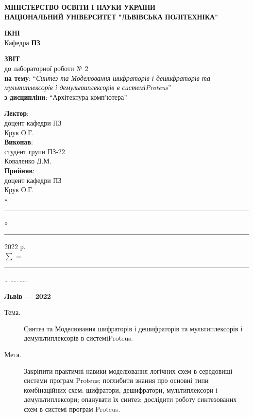 \documentclass{article}
\newcommand\subject{Архітектура комп'ютера}
\newcommand\lecturer{доцент кафедри ПЗ\\Крук О.Г.}
\newcommand\teacher{доцент кафедри ПЗ\\Крук О.Г.}
\newcommand\mygroup{ПЗ-22}
\newcommand\lab{2}
\newcommand\theme{Синтез та Моделювання шифраторів і дешифраторів та мультиплексорів і демультиплексорів в системіProteus}
\newcommand\purpose{Закріпити практичні навики моделювання логічних схем в середовищі системи програм Proteus; поглибити знання про основні типи комбінаційних схем: шифратори, дешифратори, мультиплексори і демультиплексори; опанувати їх синтез; дослідити роботу синтезованих схем в системі програм Proteus}
\begin{document}
\begin{normalsize}
	\begin{titlepage}
		\thispagestyle{empty}
		\begin{center}
			\textbf{МІНІСТЕРСТВО ОСВІТИ І НАУКИ УКРАЇНИ\\
				НАЦІОНАЛЬНИЙ УНІВЕРСИТЕТ "ЛЬВІВСЬКА ПОЛІТЕХНІКА"}
		\end{center}
		\begin{flushright}
			\textbf{ІКНІ}\\
			Кафедра \textbf{ПЗ}
		\end{flushright}
		\vspace{200pt}
		\begin{center}
			\textbf{ЗВІТ}\\
			\vspace{10pt}
			до лабораторної роботи № \lab\\
			\textbf{на тему}: “\textit{\theme}”\\
			\textbf{з дисципліни}: “\subject”
		\end{center}
		\vspace{112pt}
		\begin{flushright}
			
			\textbf{Лектор}:\\
			\lecturer\\
			\vspace{28pt}
			\textbf{Виконав}:\\
			
			студент групи \mygroup\\
			Коваленко Д.М.\\
			\vspace{28pt}
			\textbf{Прийняв}:\\
			
			\teacher\\
			
			\vspace{28pt}
			«\rule{1cm}{0.15mm}» \rule{1.5cm}{0.15mm} 2022 р.\\
			$\sum$ = \rule{1cm}{0.15mm}……………\\
			
		\end{flushright}
		\vspace{\fill}
		\begin{center}
			\textbf{Львів — 2022}
		\end{center}
	\end{titlepage}
		
	\begin{description}
		\item[Тема.] \theme.
		\item[Мета.] \purpose.
	\end{description}


\end{normalsize}
\end{document}
